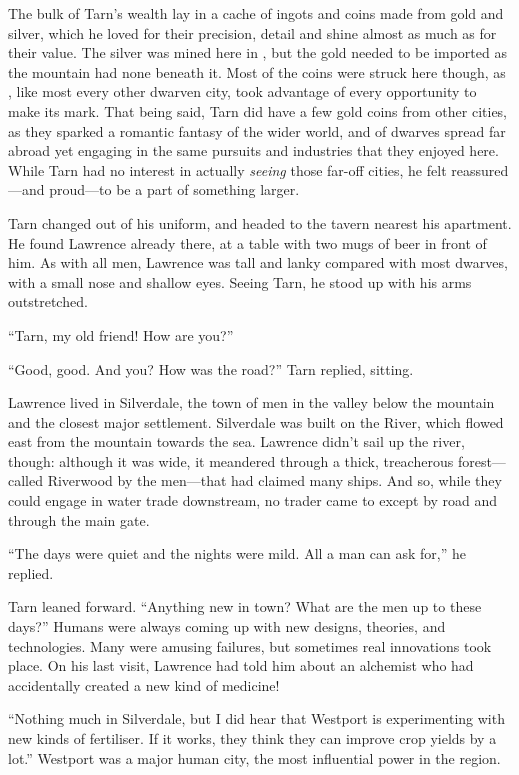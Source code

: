 The bulk of Tarn's wealth lay in a cache of ingots and coins made from gold and silver, which he loved for their precision, detail and shine almost as much as for their value.  The silver was mined here in \korbarthrond, but the gold needed to be imported as the mountain had none beneath it.  Most of the coins were struck here though, as \korbarthrond, like most every other dwarven city, took advantage of every opportunity to make its mark.  That being said, Tarn did have a few gold coins from other cities, as they sparked a romantic fantasy of the wider world, and of dwarves spread far abroad yet engaging in the same pursuits and industries that they enjoyed here.  While Tarn had no interest in actually \emph{seeing} those far-off cities, he felt reassured---and proud---to be a part of something larger.

Tarn changed out of his uniform, and headed to the tavern nearest his apartment.  He found Lawrence already there, at a table with two mugs of beer in front of him.  As with all men, Lawrence was tall and lanky compared with most dwarves, with a small nose and shallow eyes.  Seeing Tarn, he stood up with his arms outstretched.

``Tarn, my old friend!  How are you?''

``Good, good.  And you?  How was the road?'' Tarn replied, sitting.

Lawrence lived in Silverdale, the town of men in the valley below the mountain and the closest major settlement.  Silverdale was built on the \korbarthrond River, which flowed east from the mountain towards the sea.  Lawrence didn't sail up the river, though: although it was wide, it meandered through a thick, treacherous forest---called Riverwood by the men---that had claimed many ships.  And so, while they could engage in water trade downstream, no trader came to \korbarthrond except by road and through the main gate.

``The days were quiet and the nights were mild.  All a man can ask for,'' he replied.


Tarn leaned forward.  ``Anything new in town?  What are the men up to these days?''  Humans were always coming up with new designs, theories, and technologies.  Many were amusing failures, but sometimes real innovations took place.  On his last visit, Lawrence had told him about an alchemist who had accidentally created a new kind of medicine!

``Nothing much in Silverdale, but I did hear that Westport is experimenting with new kinds of fertiliser.  If it works, they think they can improve crop yields by a lot.''  Westport was a major human city, the most influential power in the region.

